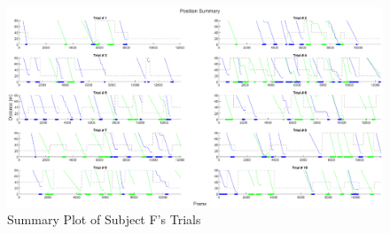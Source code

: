 \begin{appendices}
\begin{figure}[hbt!]
    \centering
    \includegraphics[width=\linewidth, height=\plotHeight\linewidth]{figures/subject_f_summary.eps}
    \caption{Summary Plot of Subject F's Trials}
    \label{fig:SumF}
\end{figure}


\end{appendices}